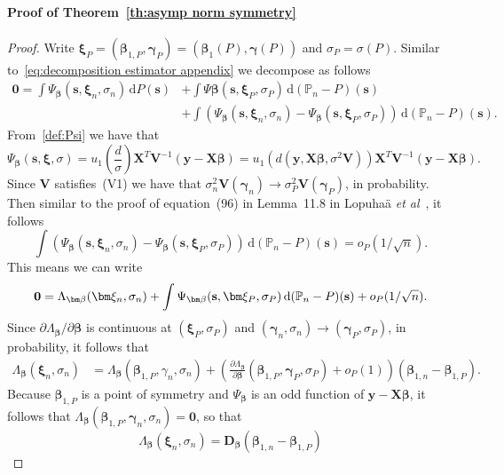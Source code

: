 \documentclass{article}
\numberwithin{equation}{section}
\theoremstyle{plain}
\newcommand{\dd}{\mathrm{d}}
\newcommand{\bbeta}{\bm\beta}
\newcommand{\bxi}{\bm\xi}
\newcommand{\bgamma}{\bm\gamma}
\newcommand{\by}{\mathbf{y}}
\newcommand{\bs}{\mathbf{s}}
\newcommand{\bX}{\mathbf{X}}
\newcommand{\bV}{\mathbf{V}}
\newcommand{\bD}{\mathbf{D}}
\begin{document}
\paragraph*{Proof of Theorem~\ref{th:asymp norm symmetry}}
\begin{proof}
Write $\bxi_P=(\bbeta_{1,P},\bgamma_P)=(\bbeta_1(P),\bgamma(P))$ and $\sigma_P=\sigma(P)$. 
Similar to~\eqref{eq:decomposition estimator appendix} we decompose as follows
\[
\begin{split}
\mathbf{0}=
\int \Psi_{\bbeta}(\mathbf{s},\bxi_n,\sigma_n)\,\dd P(\mathbf{s})
&+
\int \Psi{\bbeta}(\mathbf{s},\bxi_P,\sigma_P)\,\dd (\mathbb{P}_n-P)(\mathbf{s})\\
&+
\int
\left(
\Psi_{\bbeta}(\mathbf{s},\bxi_n,\sigma_n)-\Psi_{\bbeta}(\mathbf{s},\bxi_P,\sigma_P)
\right)
\,\dd (\mathbb{P}_n-P)(\mathbf{s}).
\end{split}
\]
From~\eqref{def:Psi} we have that
\[
\Psi_{\bbeta}(\bs,\bxi,\sigma)
=
u_1\left(
\frac{d}{\sigma}\right)\bX^T\bV^{-1}(\by-\bX\bbeta)
=
u_1\left(d(\by,\bX\bbeta,\sigma^2\bV)\right)\bX^T\bV^{-1}(\by-\bX\bbeta).
\]
Since $\bV$ satisfies~(V1) we have that $\sigma_n^2\bV(\bgamma_n)\to \sigma_P^2\bV(\bgamma_P)$, in probability.
Then similar to the proof of equation~(96) in Lemma~11.8 in Lopuha\"a \emph{et al}~\cite{supplement},
it follows
\[
\int
\left(
\Psi_{\bbeta}(\bs,\bxi_n,\sigma_n)-\Psi_{\bbeta}(\bs,\bxi_P,\sigma_P)
\right)
\,\dd (\mathbb{P}_n-P)(\bs)
=
o_P(1/\sqrt{n}).
\]
This means we can write
\begin{equation}
\label{eq:decomp Psi-beta general}
\mathbf{0}
=
\Lambda_{\bbeta}(\bxi_n,\sigma_n)
+
\int \Psi_{\bbeta}(\mathbf{s},\bxi_P,\sigma_P)\,\dd (\mathbb{P}_n-P)(\mathbf{s})\\
+
o_P(1/\sqrt{n}).
\end{equation}
Since $\partial\Lambda_{\bbeta}/\partial\bbeta$ is continuous at $(\bxi_P,\sigma_P)$
and $(\bgamma_n,\sigma_n)\to(\bgamma_P,\sigma_P)$, in probability, it follows that
\[
\begin{split}
\Lambda_{\bbeta}(\bxi_n,\sigma_n)
&=
\Lambda_{\bbeta}(\bbeta_{1,P},\gamma_n,\sigma_n)
+
\left(
\frac{\partial\Lambda_{\bbeta}}{\partial\bbeta}(\bbeta_{1,P},\bgamma_P,\sigma_P)
+
o_P(1)
\right)
(\bbeta_{1,n}-\bbeta_{1,P}).
\end{split}
\]
Because $\bbeta_{1,P}$ is a point of symmetry and $\Psi_{\bbeta}$ is an 
odd function of $\by-\bX\bbeta$, 
it follows that $\Lambda_{\bbeta}(\bbeta_{1,P},\bgamma_n,\sigma_n)=\mathbf{0}$,
so that 
\[
\Lambda_{\bbeta}(\bxi_n,\sigma_n)
=
\bD_{\bbeta}
(\bbeta_{1,n}-\bbeta_{1,P})
\]
\end{proof}
\end{document}
